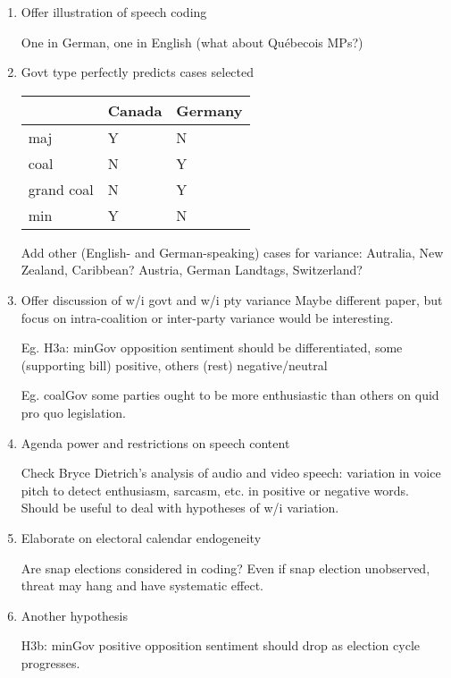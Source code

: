 \documentclass{article}
\begin{document}
\begin{enumerate}
\item Offer illustration of speech coding
\label{sec:org2aba069}

One in German, one in English (what about Québecois MPs?)

\item Govt type perfectly predicts cases selected
\label{sec:orgf10fa83}

\begin{center}
\begin{tabular}{lll}
 & Canada & Germany\\
\hline
maj & Y & N\\
coal & N & Y\\
grand coal & N & Y\\
min & Y & N\\
\end{tabular}
\end{center}

Add other (English- and German-speaking) cases for variance: Autralia, New Zealand, Caribbean? Austria, German Landtags, Switzerland?

\item Offer discussion of w/i govt and w/i pty variance
\label{sec:orgda07d00}
Maybe different paper, but focus on intra-coalition or inter-party variance would be interesting.

Eg. H3a: minGov opposition sentiment should be differentiated, some (supporting bill) positive, others (rest) negative/neutral

Eg. coalGov some parties ought to be more enthusiastic than others on quid pro quo legislation.

\item Agenda power and restrictions on speech content
\label{sec:orgacfa421}

Check Bryce Dietrich's analysis of audio and video speech: variation in voice pitch to detect enthusiasm, sarcasm, etc. in positive or negative words. Should be useful to deal with hypotheses of w/i variation. 

\item Elaborate on electoral calendar endogeneity
\label{sec:orgf41c2fc}

Are snap elections considered in coding? Even if snap election unobserved, threat may hang and have systematic effect.

\item Another hypothesis
\label{sec:orgb60e2d7}

H3b: minGov positive opposition sentiment should drop as election cycle progresses.
\end{enumerate}
\end{document}

